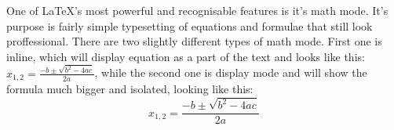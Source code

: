 One of \LaTeX{}'s most powerful and recognisable features is it's math mode. It's purpose is fairly simple typesetting of equations and formulae that still look proffessional. There are two slightly different types of math mode. First one is inline, which will display equation as a part of the text and looks like this: $x_{1,2} = \frac{-b\pm \sqrt{b^2-4ac}}{2a}$, while the second one is display mode and will show the formula much bigger and isolated, looking like this: $$x_{1,2} = \frac{-b\pm \sqrt{b^2-4ac}}{2a}$$